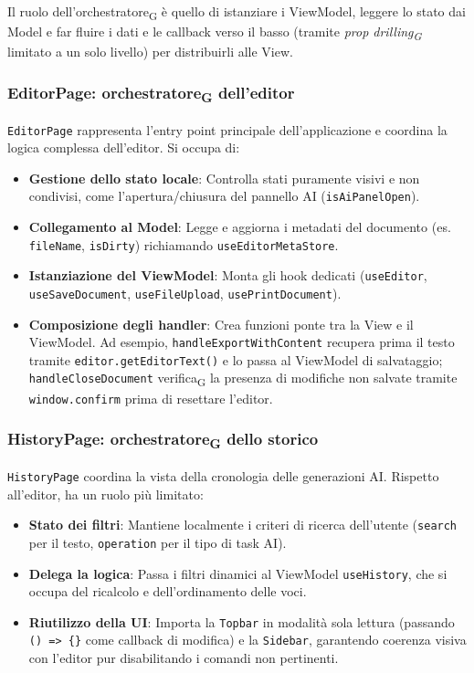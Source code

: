 \documentclass[11pt,a4paper]{article}
\newcommand{\gls}[1]{#1\textsubscript{G}}
\begin{document}
Il ruolo dell'\gls{orchestratore} è quello di istanziare i ViewModel, leggere lo stato dai Model e far fluire i dati e le callback verso il basso (tramite \textit{\gls{prop drilling}} limitato a un solo livello) per distribuirli alle View.

\subsubsection{EditorPage: \gls{orchestratore} dell'editor}
\texttt{EditorPage} rappresenta l'entry point principale dell'applicazione e coordina la logica complessa dell'editor. Si occupa di:
\begin{itemize}
    \item \textbf{Gestione dello stato locale}: Controlla stati puramente visivi e non condivisi, come l'apertura/chiusura del pannello AI (\texttt{isAiPanelOpen}).
    \item \textbf{Collegamento al Model}: Legge e aggiorna i metadati del documento (es. \texttt{fileName}, \texttt{isDirty}) richiamando \texttt{useEditorMetaStore}.
    \item \textbf{Istanziazione del ViewModel}: Monta gli hook dedicati (\texttt{useEditor}, \texttt{useSaveDocument}, \texttt{useFileUpload}, \texttt{usePrintDocument}).
    \item \textbf{Composizione degli handler}: Crea funzioni ponte tra la View e il ViewModel. Ad esempio, \texttt{handleExportWithContent} recupera prima il testo tramite \texttt{editor.getEditorText()} e lo passa al ViewModel di salvataggio; \texttt{handleCloseDocument} \gls{verifica} la presenza di modifiche non salvate tramite \texttt{window.confirm} prima di resettare l'editor.
\end{itemize}

\subsubsection{HistoryPage: \gls{orchestratore} dello storico}
\texttt{HistoryPage} coordina la vista della cronologia delle generazioni AI. Rispetto all'editor, ha un ruolo più limitato:
\begin{itemize}
    \item \textbf{Stato dei filtri}: Mantiene localmente i criteri di ricerca dell'utente (\texttt{search} per il testo, \texttt{operation} per il tipo di task AI).
    \item \textbf{Delega la logica}: Passa i filtri dinamici al ViewModel \texttt{useHistory}, che si occupa del ricalcolo e dell'ordinamento delle voci.
    \item \textbf{Riutilizzo della UI}: Importa la \texttt{Topbar} in modalità sola lettura (passando \texttt{() => \{\}} come callback di modifica) e la \texttt{Sidebar}, garantendo coerenza visiva con l'editor pur disabilitando i comandi non pertinenti.
\end{itemize}
\end{document}
